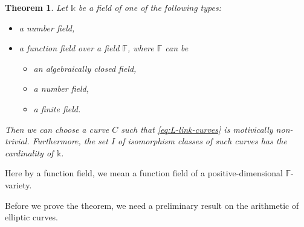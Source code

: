 \documentclass[a4paper,12pt]{amsart}
\def\F{\mathbb F}
\def\k{\mathbb k}
\theoremstyle{plain}
\newtheorem{theorem}[dummy]{Theorem}
\numberwithin{equation}{section}
\theoremstyle{definition}
\renewcommand{\(}{\left(}
\renewcommand{\)}{\right)}
\begin{document}
\begin{theorem}\label{thm:ell-curves}
Let $\k$ be a 
field
of one of the following types:
\begin{itemize}
    \item a number field,
    \item a function field over a field $\F$,
    where $\F$ can be
    \begin{itemize}
        \item an algebraically closed field, 
        \item a number field,
        \item a finite field. 
    \end{itemize}
\end{itemize}
Then we can choose a curve
$C$ such that \eqref{eq:L-link-curves} is motivically non-trivial.
Furthermore, 
the set $I$ of isomorphism classes of such curves has the cardinality of $\k$.
\end{theorem}

Here by a function field, we mean
a function field of a positive-dimensional
$\F$-variety.

\medskip

Before we prove the theorem, we need a preliminary result 
on the arithmetic of elliptic curves.
\end{document}
